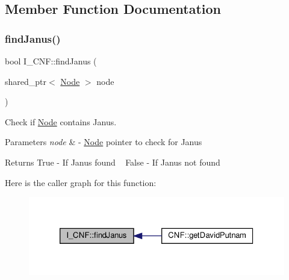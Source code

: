 \subsection{Member Function Documentation}
\mbox{\label{struct_i___c_n_f_ac9fd631eda1871653b2d1fdcd55f18a5}} 
\subsubsection{\texorpdfstring{find\+Janus()}{findJanus()}}
{\footnotesize\ttfamily bool I\+\_\+\+C\+N\+F\+::find\+Janus (\begin{DoxyParamCaption}\item[{shared\+\_\+ptr$<$ \hyperlink{class_node}{Node} $>$}]{node }\end{DoxyParamCaption})\hspace{0.3cm}{\ttfamily [protected]}}



Check if \hyperlink{class_node}{Node} contains Janus. 


\begin{DoxyParams}{Parameters}
{\em node} & -\/ \hyperlink{class_node}{Node} pointer to check for Janus \\
\hline
\end{DoxyParams}
\begin{DoxyReturn}{Returns}
True -\/ If Janus found ~\newline
 False -\/ If Janus not found 
\end{DoxyReturn}
Here is the caller graph for this function\+:\nopagebreak
\begin{figure}[H]
\begin{center}
\leavevmode
\includegraphics[width=326pt]{d5/d80/struct_i___c_n_f_ac9fd631eda1871653b2d1fdcd55f18a5_icgraph}
\end{center}
\end{figure}
\mbox{\label{struct_i___c_n_f_afedf64bb258fd48ea0f811a9f571f0f0}} 
